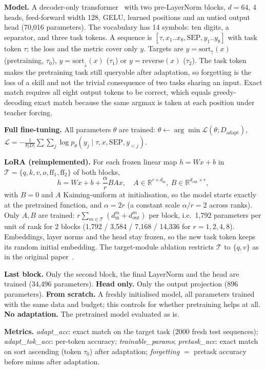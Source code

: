 \textbf{Model.} A decoder-only transformer~\cite{vaswani2017attention} with two pre-LayerNorm blocks, $d=64$, 4 heads, feed-forward width 128, GELU, learned positions and an untied output head (70,016 parameters). The vocabulary has 14 symbols: ten digits, a separator, and three task tokens. A sequence is $[\tau, x_1..x_8, \mathrm{SEP}, y_1..y_8]$ with task token $\tau$; the loss and the metric cover only $y$. Targets are $y=\mathrm{sort}_\uparrow(x)$ (pretraining, $\tau_0$), $y=\mathrm{sort}_\downarrow(x)$ ($\tau_1$) or $y=\mathrm{reverse}(x)$ ($\tau_2$). The task token makes the pretraining task still queryable after adaptation, so forgetting is the loss of a skill and not the trivial consequence of two tasks sharing an input. Exact match requires all eight output tokens to be correct, which equals greedy-decoding exact match because the same argmax is taken at each position under teacher forcing.

\textbf{Full fine-tuning.} All parameters $\theta$ are trained: $\theta \leftarrow \arg\min \mathcal{L}(\theta; D_\mathrm{adapt})$, $\mathcal{L}=-\frac{1}{8|D|}\sum \sum_j \log p_\theta(y_j\mid \tau, x, \mathrm{SEP}, y_{<j})$.

\textbf{LoRA (reimplemented).} For each frozen linear map $h = Wx + b$ in $\mathcal{T}=\{q,k,v,o,\mathrm{ff}_1,\mathrm{ff}_2\}$ of both blocks,
\begin{equation}
h = Wx + b + \frac{\alpha}{r} B A x,\quad A\in\mathbb{R}^{r\times d_\mathrm{in}},\ B\in\mathbb{R}^{d_\mathrm{out}\times r},
\end{equation}
with $B=0$ and $A$ Kaiming-uniform at initialisation, so the model starts exactly at the pretrained function, and $\alpha=2r$ (a constant scale $\alpha/r=2$ across ranks). Only $A,B$ are trained: $r\sum_{m\in\mathcal{T}}(d_\mathrm{in}^m+d_\mathrm{out}^m)$ per block, i.e.\ 1,792 parameters per unit of rank for $2$ blocks (1,792 / 3,584 / 7,168 / 14,336 for $r=1,2,4,8$). Embeddings, layer norms and the head stay frozen, so the new task token keeps its random initial embedding. The target-module ablation restricts $\mathcal{T}$ to $\{q,v\}$ as in the original paper~\cite{hu2021lora}.

\textbf{Last block.} Only the second block, the final LayerNorm and the head are trained (34,496 parameters). \textbf{Head only.} Only the output projection (896 parameters). \textbf{From scratch.} A freshly initialised model, all parameters trained with the same data and budget; this controls for whether pretraining helps at all. \textbf{No adaptation.} The pretrained model evaluated as is.

\textbf{Metrics.} \emph{adapt\_acc}: exact match on the target task (2000 fresh test sequences); \emph{adapt\_tok\_acc}: per-token accuracy; \emph{trainable\_params}; \emph{pretask\_acc}: exact match on sort ascending (token $\tau_0$) after adaptation; \emph{forgetting} $=$ pretask accuracy before minus after adaptation.
